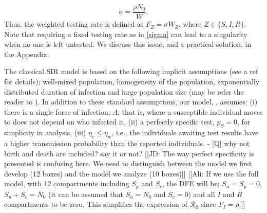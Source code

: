 \documentclass[12pt]{article}
\newcommand{\Rnum}{\mathcal{R}_0}
\theoremstyle{definition} %
\begin{document}
\begin{equation}
\label{sigma}
\sigma = \frac{\rho N_0}{W}.
\end{equation}
Thus, the weighted testing rate is defined as $F_Z=\sigma W_Z$, where $Z \in \{S,I,R\}$. Note that requiring a fixed testing rate as in \eqref{sigma} can lead to a singularity when no one is left untested. We discuss this issue, and a practical solution, in the Appendix. 

The classical SIR model is based on the following implicit assumptions (see a ref for details); well-mixed population, homogeneity of the population, exponentially distributed duration of infection and large population size (may be refer the reader to \cite{keeling2011modeling}). In addition to these standard assumptions, our model, , assumes: (i) there is a single force of infection, $\Lambda$, that is, where a susceptible individual moves to does not depend on who infected it, (ii) a perfectly specific test, $p_S=0$, for simplicity in analysis, (iii)  $\eta_c \leq \eta_w$, i.e., the individuals awaiting test results have a higher transmission probability than the reported individuals. - [Q] why not birth and death are included? say it or not? [[JD: The way perfect specificity is presented is confusing here. We need to distinguish between the model we first develop (12 boxes) and the model we analyze (10 boxes)]]
[[Ali: If we use the full model, with 12 compartments including $S_p$ and $S_c$, the DFE will be; $S_n=S_p=0$, $S_u+S_c=N_0$ (it can be assumed that $S_u=N_0$ and $S_c=0$) and all $I$ and $R$ compartments to be zero. This simplifies the expression of $\Rnum$ since $F_I=\rho$.]]
\end{document}

